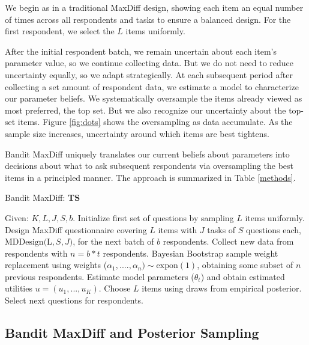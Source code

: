 \documentclass[nonblindrev]{informs3}
\newcommand{\ts}{\textbf{TS} }
\newcommand{\numperset}{L}
\begin{document}
We begin as in a traditional MaxDiff design, showing each item an equal number of times across all respondents and tasks to ensure a balanced design.  For the first respondent, we select the $\numperset$ items uniformly. 

After the initial respondent batch, we remain uncertain about each item's parameter value, so we continue collecting data. But we do not need to reduce uncertainty equally, so we adapt strategically. At each subsequent period after collecting a set amount of respondent data, we estimate a model to characterize our parameter beliefs. We systematically oversample the items already viewed as most preferred, the top set. But we also recognize our uncertainty about the top-set items. Figure \ref{fig:dots} shows the oversampling as data accumulate. As the sample size increases, uncertainty around which items are best tightens.


Bandit MaxDiff uniquely translates our current beliefs about parameters into decisions about what to ask subsequent respondents via oversampling the best items in a principled manner. The approach is summarized in Table \ref{methods}.

\begin{algorithm}
\caption{Bandit MaxDiff: \ts} \label{alg:ts_simple}
\begin{algorithmic}[1]
\State Given: $K,\numperset,J,S,b$.
\State Initialize first set of questions by sampling $\numperset$ items uniformly.
\State Design MaxDiff questionnaire covering $\numperset$ items with $J$ tasks of $S$ questions each, $\text{MDDesign}($\numperset$,S,J)$, for the next batch of $b$ respondents.
\State Collect new data from respondents with $n = b*t$ respondents.
\State Bayesian Bootstrap sample weight replacement using weights ($\alpha_1, ...., \alpha_n)\sim \text{expon}(1)$, obtaining some subset of $n$ previous respondents.
\State Estimate model parameters ($\theta_t$) and obtain estimated utilities $u = (u_1,...,u_K)$.
\State Choose $\numperset$ items using draws from empirical posterior.
\State Select next questions for respondents.
\end{algorithmic}
\end{algorithm}



\subsection{Bandit MaxDiff and Posterior Sampling} \label{sec:bmd_ts_edts}
\end{document}
